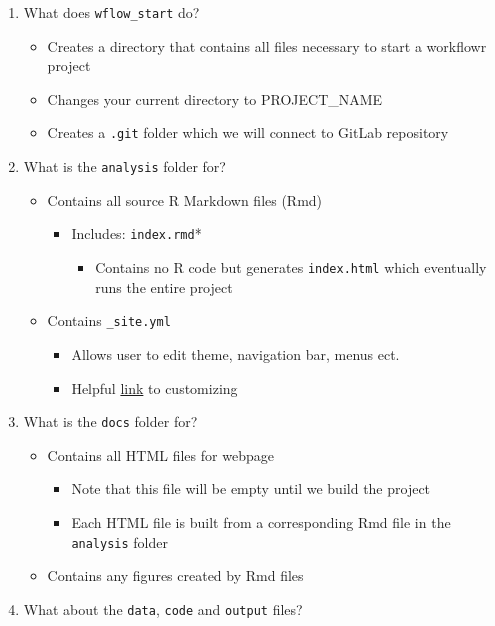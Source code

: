 \documentclass[openany]{book}
\providecommand{\tightlist}{%
  \setlength{\itemsep}{0pt}\setlength{\parskip}{0pt}}
\begin{document}
\begin{enumerate}
\def\labelenumi{\arabic{enumi}.}
\tightlist
\item
  What does \texttt{wflow\_start} do?

  \begin{itemize}
  \tightlist
  \item
    Creates a directory that contains all files necessary to start a workflowr project
  \item
    Changes your current directory to PROJECT\_NAME
  \item
    Creates a \texttt{.git} folder which we will connect to GitLab repository
  \end{itemize}
\item
  What is the \texttt{analysis} folder for?

  \begin{itemize}
  \tightlist
  \item
    Contains all source R Markdown files (Rmd)

    \begin{itemize}
    \tightlist
    \item
      Includes: \texttt{index.rmd}*

      \begin{itemize}
      \tightlist
      \item
        Contains no R code but generates \texttt{index.html} which eventually runs the entire project
      \end{itemize}
    \end{itemize}
  \item
    Contains \texttt{\_site.yml}

    \begin{itemize}
    \tightlist
    \item
      Allows user to edit theme, navigation bar, menus ect.
    \item
      Helpful \href{https://bookdown.org/yihui/rmarkdown/rmarkdown-site.html}{link} to customizing
    \end{itemize}
  \end{itemize}
\item
  What is the \texttt{docs} folder for?

  \begin{itemize}
  \tightlist
  \item
    Contains all HTML files for webpage

    \begin{itemize}
    \tightlist
    \item
      Note that this file will be empty until we build the project
    \item
      Each HTML file is built from a corresponding Rmd file in the \texttt{analysis} folder
    \end{itemize}
  \item
    Contains any figures created by Rmd files
  \end{itemize}
\item
  What about the \texttt{data}, \texttt{code} and \texttt{output} files?


\end{enumerate}
\end{document}
